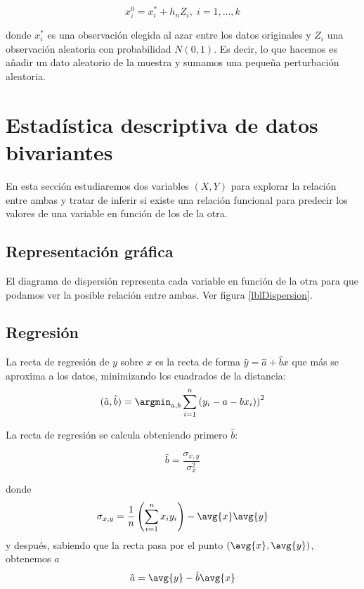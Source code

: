 \documentclass{apuntes}
\begin{document}
\[ x_i^0 = x_i^* + h_n Z_i,\; i=1,\dotsc, k \]

donde $x_i^*$ es una observación elegida al azar entre los datos originales y $Z_i$ una observación aleatoria con probabilidad $N(0,1)$. Es decir, lo que hacemos es añadir un dato aleatorio de la muestra y sumamos una pequeña perturbación aleatoria.

\section{Estadística descriptiva de datos bivariantes}

En esta sección estudiaremos dos variables $(X, Y)$ para explorar la relación entre ambas y tratar de inferir si existe una relación funcional para predecir los valores de una variable en función de los de la otra.

\subsection{Representación gráfica}

\begin{defn}
El diagrama de dispersión representa cada variable en función de la otra para que podamos ver la posible relación entre ambas. Ver figura \ref{lblDispersion}.

\end{defn} 

\subsection{Regresión}

\begin{defn}

La recta de regresión de $y$ sobre $x$ es la recta de forma $\hat{y} = \hat{a} + \hat{b}x$ que más se aproxima a los datos, minimizando los cuadrados de la distancia: \[ (\hat{a},\hat{b}) =\argmin_{a, b} \sum_{i=1}^n\left(y_i - a - bx_i)\right)^2 \]
\end{defn}

La recta de regresión se calcula obteniendo primero $\hat{b}$:

\[ \hat{b} = \frac{\sigma_{x,y}}{\sigma^2_x} \]

donde \[ \sigma_{x,y} = \frac{1}{n} \left( \sum_{i=1}^n x_i y_i\right)  - \avg{x}\avg{y} \] y después, sabiendo que la recta pasa por el punto $(\avg{x}, \avg{y})$, obtenemos $\hat{a}$ \[ \hat{a} = \avg{y} - \hat{b}\avg{x} \]
\end{document}
